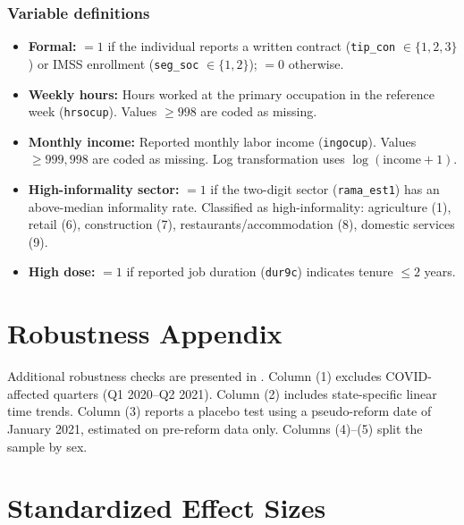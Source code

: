 \documentclass[12pt]{article}
\begin{document}
\subsubsection*{Variable definitions}
\begin{itemize}
\item \textbf{Formal:} $= 1$ if the individual reports a written contract (\texttt{tip\_con} $\in \{1,2,3\}$) or IMSS enrollment (\texttt{seg\_soc} $\in \{1,2\}$); $= 0$ otherwise.
\item \textbf{Weekly hours:} Hours worked at the primary occupation in the reference week (\texttt{hrsocup}). Values $\geq 998$ are coded as missing.
\item \textbf{Monthly income:} Reported monthly labor income (\texttt{ingocup}). Values $\geq 999{,}998$ are coded as missing. Log transformation uses $\log(\text{income} + 1)$.
\item \textbf{High-informality sector:} $= 1$ if the two-digit sector (\texttt{rama\_est1}) has an above-median informality rate. Classified as high-informality: agriculture (1), retail (6), construction (7), restaurants/accommodation (8), domestic services (9).
\item \textbf{High dose:} $= 1$ if reported job duration (\texttt{dur9c}) indicates tenure $\leq 2$ years.
\end{itemize}

\section{Robustness Appendix}

Additional robustness checks are presented in . Column (1) excludes COVID-affected quarters (Q1 2020--Q2 2021). Column (2) includes state-specific linear time trends. Column (3) reports a placebo test using a pseudo-reform date of January 2021, estimated on pre-reform data only. Columns (4)--(5) split the sample by sex.

\section{Standardized Effect Sizes}
\label{sec:sde}


\end{document}
